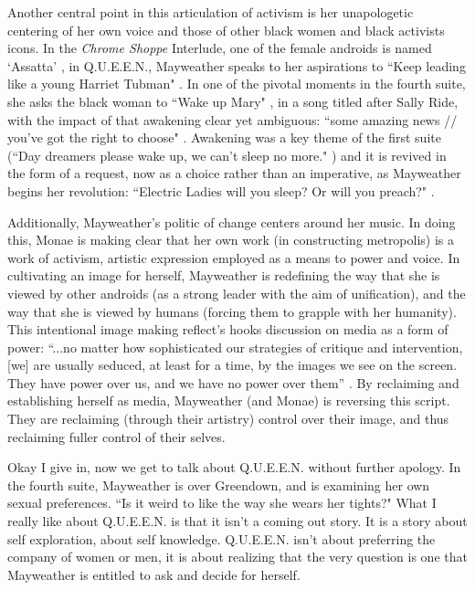 \documentclass[a4paper, 11pt]{article} %
\begin{document}
Another central point in this articulation of activism is her unapologetic centering of her own voice and those of other black women and black activists icons.
In the \emph{Chrome Shoppe} Interlude, one of the female androids is named `Assatta' \cite{chromeshoppe}, in Q.U.E.E.N., Mayweather speaks to her aspirations to ``Keep leading like a young Harriet Tubman" \cite{queen}.
In one of the pivotal moments in the fourth suite, she asks the black woman to ``Wake up Mary" \cite{sallyride}, in a song titled after Sally Ride, with the impact of that awakening clear yet ambiguous: ``some amazing news // you've got the right to choose" \cite{sallyride}. Awakening was a key theme of the first suite (``Day dreamers please wake up, we can't sleep no more." \cite{sincerelyjane}) and it is revived in the form of a request, now as a choice rather than an imperative, as Mayweather begins her revolution: ``Electric Ladies will you sleep? Or will you preach?" \cite{queen}.

Additionally, Mayweather's politic of change centers around her music.
In doing this, Monae is making clear that her own work (in constructing metropolis) is a work of activism, artistic expression employed as a means to power and voice.
In cultivating an image for herself, Mayweather is redefining the way that she is viewed by other androids (as a strong leader with the aim of unification), and the way that she is viewed by humans (forcing them to grapple with her humanity).
This intentional image making reflect's hooks discussion on media as a form of power: ``...no matter how sophisticated our strategies of critique and intervention, [we] are usually seduced, at least for a time, by the images we see on the screen. They have power over us, and we have no power over them'' \cite{hooksmediatheory}.
By reclaiming and establishing herself as media, Mayweather (and Monae) is reversing this script.
They are reclaiming (through their artistry) control over their image, and thus reclaiming fuller control of their selves.

Okay I give in, now we get to talk about Q.U.E.E.N. without further apology.
In the fourth suite, Mayweather is over Greendown, and is examining her own sexual preferences.
``Is it weird to like the way she wears her tights?" \cite{queen}
What I really like about Q.U.E.E.N. is that it isn't a coming out story.
It is a story about self exploration, about self knowledge. 
Q.U.E.E.N. isn't about preferring the company of women or men, it is about realizing that the very question is one that Mayweather is entitled to ask and decide for herself.
\end{document}
